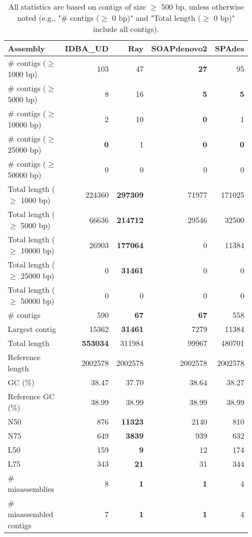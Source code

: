 \documentclass[12pt,a4paper]{article}
\begin{document}
\begin{table}[ht]
\begin{center}
\caption{All statistics are based on contigs of size $\geq$ 500 bp, unless otherwise noted (e.g., "\# contigs ($\geq$ 0 bp)" and "Total length ($\geq$ 0 bp)" include all contigs).}
\begin{tabular}{|l*{4}{|r}|}
\hline
Assembly & IDBA\_UD & Ray & SOAPdenovo2 & SPAdes \\ \hline
\# contigs ($\geq$ 1000 bp) & 103 & 47 & {\bf 27} & 95 \\ \hline
\# contigs ($\geq$ 5000 bp) & 8 & 16 & {\bf 5} & {\bf 5} \\ \hline
\# contigs ($\geq$ 10000 bp) & 2 & 10 & {\bf 0} & 1 \\ \hline
\# contigs ($\geq$ 25000 bp) & {\bf 0} & 1 & {\bf 0} & {\bf 0} \\ \hline
\# contigs ($\geq$ 50000 bp) & 0 & 0 & 0 & 0 \\ \hline
Total length ($\geq$ 1000 bp) & 224360 & {\bf 297309} & 71977 & 171025 \\ \hline
Total length ($\geq$ 5000 bp) & 66636 & {\bf 214712} & 29546 & 32500 \\ \hline
Total length ($\geq$ 10000 bp) & 26903 & {\bf 177064} & 0 & 11384 \\ \hline
Total length ($\geq$ 25000 bp) & 0 & {\bf 31461} & 0 & 0 \\ \hline
Total length ($\geq$ 50000 bp) & 0 & 0 & 0 & 0 \\ \hline
\# contigs & 590 & {\bf 67} & {\bf 67} & 558 \\ \hline
Largest contig & 15362 & {\bf 31461} & 7279 & 11384 \\ \hline
Total length & {\bf 553034} & 311984 & 99967 & 480701 \\ \hline
Reference length & 2002578 & 2002578 & 2002578 & 2002578 \\ \hline
GC (\%) & 38.47 & 37.70 & 38.64 & 38.27 \\ \hline
Reference GC (\%) & 38.99 & 38.99 & 38.99 & 38.99 \\ \hline
N50 & 876 & {\bf 11323} & 2140 & 810 \\ \hline
N75 & 649 & {\bf 3839} & 939 & 632 \\ \hline
L50 & 159 & {\bf 9} & 12 & 174 \\ \hline
L75 & 343 & {\bf 21} & 31 & 344 \\ \hline
\# misassemblies & 8 & {\bf 1} & {\bf 1} & 4 \\ \hline
\# misassembled contigs & 7 & {\bf 1} & {\bf 1} & 4 \\ \hline

\end{tabular}
\end{center}
\end{table}
\end{document}
